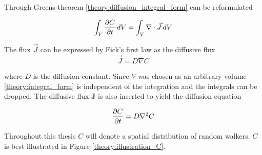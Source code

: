 \noindent Through Greens theorem \eqref{theory:diffusion_integral_form} can be reformulated

\begin{equation}\label{theory:integral_form}
 \int_V \frac{\partial C}{\partial t}\,dV = \int_V\nabla\cdot\vec{J}\,dV
\end{equation}

\noindent The flux $\vec{J}$ can be expressed by Fick's first law as the diffusive flux 
\begin{equation}
 \vec J = D\nabla C
\end{equation}

\noindent where $D$ is the diffusion constant. Since $V$ was chosen as an arbitrary volume \eqref{theory:integral_form} is independent of the integration and the integrals can be dropped. 
The diffusive flux $\mathbf{J}$ is also inserted to yield the diffusion equation

\begin{equation}\label{theory:diffusion_equation}
 \frac{\partial C}{\partial t} = D\nabla^2 C
\end{equation}

\noindent Throughout this thesis $C$ will denote a spatial distribution of random walkers. 
$C$ is best illustrated in Figure \ref{theory:illustration_C}.

